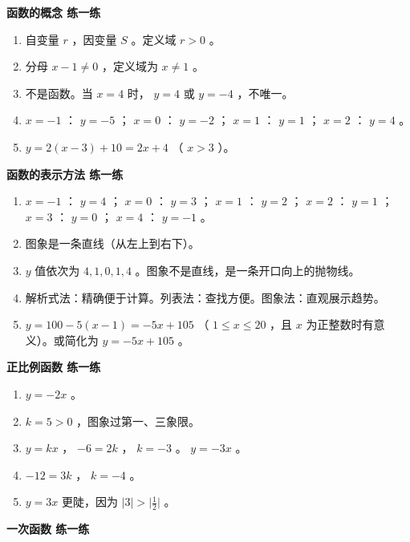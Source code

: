 \begin{answer}


\textbf{函数的概念 练一练}

\begin{enumerate}
  \item 自变量 $r$ ，因变量 $S$ 。定义域 $r > 0$ 。
  \item 分母 $x - 1 \neq 0$ ，定义域为 $x \neq 1$ 。
  \item 不是函数。当 $x = 4$ 时， $y = 4$ 或 $y = -4$ ，不唯一。
  \item $x = -1$ ： $y = -5$ ； $x = 0$ ： $y = -2$ ； $x = 1$ ： $y = 1$ ； $x = 2$ ： $y = 4$ 。
  \item $y = 2(x - 3) + 10 = 2x + 4$ （ $x > 3$ ）。
\end{enumerate}


\textbf{函数的表示方法 练一练}

\begin{enumerate}
  \item $x = -1$ ： $y = 4$ ； $x = 0$ ： $y = 3$ ； $x = 1$ ： $y = 2$ ； $x = 2$ ： $y = 1$ ； $x = 3$ ： $y = 0$ ； $x = 4$ ： $y = -1$ 。
  \item 图象是一条直线（从左上到右下）。
  \item $y$ 值依次为 $4, 1, 0, 1, 4$ 。图象不是直线，是一条开口向上的抛物线。
  \item 解析式法：精确便于计算。列表法：查找方便。图象法：直观展示趋势。
  \item $y = 100 - 5(x - 1) = -5x + 105$ （ $1 \leq x \leq 20$ ，且 $x$ 为正整数时有意义）。或简化为 $y = -5x + 105$ 。
\end{enumerate}


\textbf{正比例函数 练一练}

\begin{enumerate}
  \item $y = -2x$ 。
  \item $k = 5 > 0$ ，图象过第一、三象限。
  \item $y = kx$ ， $-6 = 2k$ ， $k = -3$ 。 $y = -3x$ 。
  \item $-12 = 3k$ ， $k = -4$ 。
  \item $y = 3x$ 更陡，因为 $\lvert 3 \rvert > \lvert \frac{1}{2} \rvert$ 。
\end{enumerate}


\textbf{一次函数 练一练}


\end{answer}

